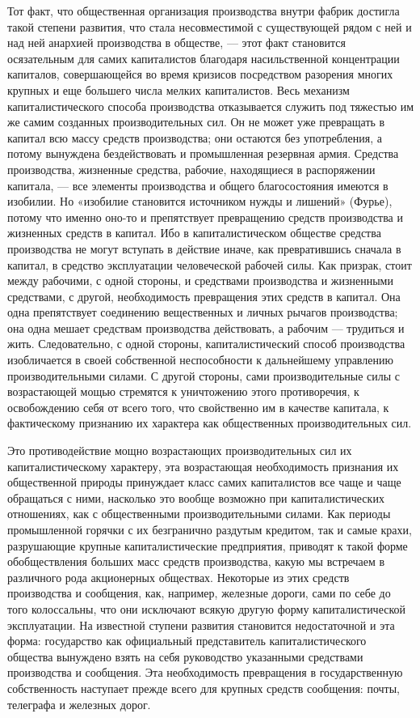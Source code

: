 \documentclass[12pt]{article}
\newcommand{\parnum}{(\arabic{parcount})}
\newcounter{parcount}
\newenvironment{parnumbers}{%
  \par%
  \everypar{\noindent \stepcounter{parcount}\marginpar[]{\parnum}}%
}{}
\begin{document}
\begin{parnumbers}
    Тот факт, что общественная организация производства внутри фабрик достигла такой степени развития, что стала несовместимой с существующей рядом с ней и над ней анархией производства в обществе, — этот факт становится осязательным для самих капиталистов благодаря насильственной концентрации капиталов, совершающейся во время кризисов посредством разорения многих крупных и еще большего числа мелких капиталистов. Весь механизм капиталистического способа производства отказывается служить под тяжестью им же самим созданных производительных сил. Он не может уже превращать в капитал всю массу средств производства; они остаются без употребления, а потому вынуждена бездействовать и промышленная резервная армия. Средства производства, жизненные средства, рабочие, находящиеся в распоряжении капитала, — все элементы производства и общего благосостояния имеются в изобилии. Но «изобилие становится источником нужды и лишений» (Фурье), потому что именно оно-то и препятствует превращению средств производства и жизненных средств в капитал. Ибо в капиталистическом обществе средства производства не могут вступать в действие иначе, как превратившись сначала в капитал, в средство эксплуатации человеческой рабочей силы. Как призрак, стоит между рабочими, с одной стороны, и средствами производства и жизненными средствами, с другой, необходимость превращения этих средств в капитал. Она одна препятствует соединению вещественных и личных рычагов производства; она одна мешает средствам производства действовать, а рабочим — трудиться и жить. Следовательно, с одной стороны, капиталистический способ производства изобличается в своей собственной неспособности к дальнейшему управлению производительными силами. С другой стороны, сами производительные силы с возрастающей мощью стремятся к уничтожению этого противоречия, к освобождению себя от всего того, что свойственно им в качестве капитала, к фактическому признанию их характера как общественных производительных сил.

    Это противодействие мощно возрастающих производительных сил их капиталистическому характеру, эта возрастающая необходимость признания их общественной природы принуждает класс самих капиталистов все чаще и чаще обращаться с ними, насколько это вообще возможно при капиталистических отношениях, как с общественными производительными силами. Как периоды промышленной горячки с их безгранично раздутым кредитом, так и самые крахи, разрушающие крупные капиталистические предприятия, приводят к такой форме обобществления больших масс средств производства, какую мы встречаем в различного рода акционерных обществах. Некоторые из этих средств производства и сообщения, как, например, железные дороги, сами по себе до того колоссальны, что они исключают всякую другую форму капиталистической эксплуатации. На известной ступени развития становится недостаточной и эта форма: государство как официальный представитель капиталистического общества вынуждено взять на себя руководство указанными средствами производства и сообщения. Эта необходимость превращения в государственную собственность наступает прежде всего для крупных средств сообщения: почты, телеграфа и железных дорог.


\end{parnumbers}
\end{document}
